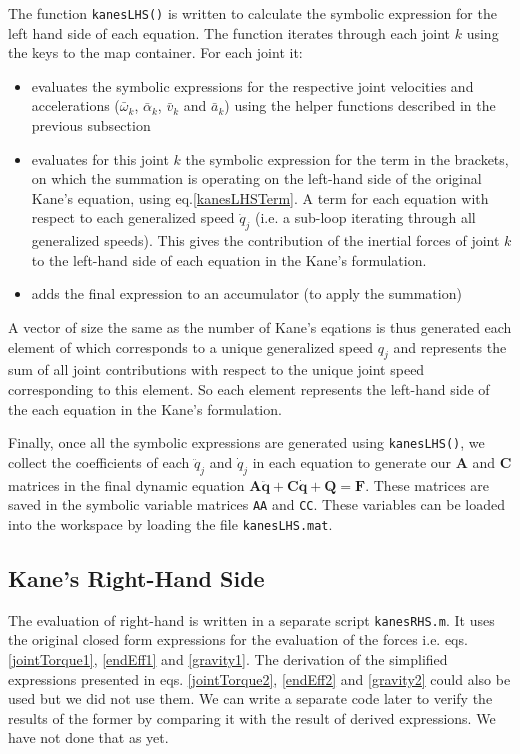 \documentclass[a4paper,10pt]{article}
\begin{document}
The function \texttt{kanesLHS()} is written to calculate the symbolic expression for the left hand side of each equation.
The function iterates through each joint $k$ using the keys to the map container. For each joint it:
\begin{itemize}
 \item evaluates the symbolic expressions for the respective joint velocities and accelerations ($\bar\omega_k$, $\bar\alpha_k$, 
 $\bar{v}_k$ and $\bar{a}_k$) using the helper functions described in the previous subsection
 \item evaluates for this joint $k$ the symbolic expression for the term in the brackets, on which the summation
 is operating on the left-hand side of the original Kane's equation, using eq.\ref{kanesLHSTerm}. A term
 for each equation with respect to each generalized speed $\dot{q}_j$ (i.e. a  sub-loop iterating through all generalized speeds). 
 This gives the contribution of the inertial forces of joint $k$ to the left-hand side
 of each equation in the Kane's formulation.
 \item adds the final expression to an accumulator (to apply the summation)
\end{itemize}
A vector of size the same as the number of Kane's eqations is thus generated each element of which corresponds to a unique generalized speed $q_j$ and
represents the sum of all joint contributions with respect to the unique joint speed corresponding to this element. So each element represents
the left-hand side of the each equation in the Kane's formulation.

Finally, once all the symbolic expressions are generated using \texttt{kanesLHS()}, we collect the coefficients of each $\ddot{q}_j$
and $\dot{q}_j$ in each equation to generate our $\mathbf{A}$ and $\mathbf{C}$ matrices in the final dynamic equation 
$\mathbf{A\ddot{q}+C\dot{q}+Q=F}$. These matrices are saved in the symbolic variable matrices \texttt{AA} and \texttt{CC}.
These variables can be loaded into the workspace by loading the file \texttt{kanesLHS.mat}.

\subsection{Kane's Right-Hand Side}
The evaluation of right-hand is written in a separate script \texttt{kanesRHS.m}. It uses the original closed form
expressions for the evaluation of the forces i.e. eqs. \ref{jointTorque1}, \ref{endEff1} and \ref{gravity1}. 
The derivation of the simplified expressions presented in eqs. \ref{jointTorque2}, \ref{endEff2} and \ref{gravity2} 
could also be used but we did not use them. We can write a separate code later to verify the results of the former by comparing it with the
result of derived expressions. We have not done that as yet.
\end{document}
